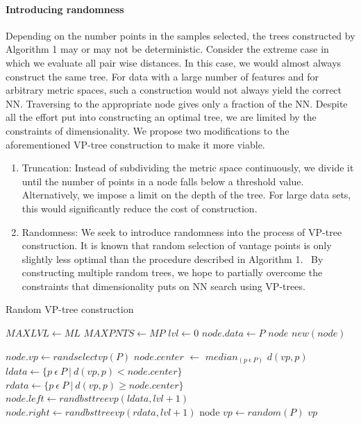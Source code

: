 \documentclass[11pt]{article}
\begin{document}
\paragraph{Introducing randomness} Depending on the number points in the samples selected, the trees constructed by Algorithm 1 may or may not be deterministic. Consider the extreme case in which we evaluate all pair wise distances. In this case, we would almost always construct the same tree. For data with a large number of features and for arbitrary metric spaces, such a construction would not always yield the correct NN. Traversing to the appropriate node gives only a fraction of the NN. Despite all the effort put into constructing an optimal tree, we are limited by the constraints of dimensionality. We propose two modifications to the aforementioned VP-tree construction to make it more viable.
\begin{enumerate}
\item Truncation: Instead of subdividing the metric space continuously, we divide it until the number of points in a node falls below a threshold value. Alternatively, we impose a limit on the depth of the tree. For large data sets, this would significantly reduce the cost of construction. 
\item Randomness: We seek to introduce randomness into the process of VP-tree construction. It is known that random selection of vantage points is only slightly less optimal than the procedure described in Algorithm 1.~\cite{Yianilos93} By constructing multiple random trees, we hope to partially overcome the constraints that dimensionality puts on NN search using VP-trees. 
\end{enumerate}

\begin{algorithm}[h]
\caption{Random VP-tree construction}
\label{alg:vp-treeconr}
\begin{algorithmic}[1]
\State $MAXLVL \gets ML$
\State $MAXPNTS \gets MP$
\State $lvl \gets 0$
\State $node.data \gets P$
\State \Return $node$
\EndIf
\State $new(node)$
\end{algorithmic}
\end{algorithm}

\begin{algorithm}[h]
\begin{algorithmic}[1]
\State $node.vp \gets randselectvp(P)$
\State $node.center$ $\gets$ $median_{(p\ \epsilon\ P)}$ $d(vp, p)$
\State $ldata \gets \{p\ \epsilon\ P\ |\ d(vp, p) < node.center\}$
\State $rdata \gets \{p\ \epsilon\ P\ |\ d(vp, p) \geq node.center\}$
\State $node.left \gets randbsttreevp(ldata, lvl + 1)$
\State $node.right \gets randbsttreevp(rdata, lvl + 1)$
\State \Return node
\EndProcedure
{}
\State $vp \gets random(P)$
\State \Return $vp$
\EndProcedure
\end{algorithmic}
\end{algorithm}
\end{document}
